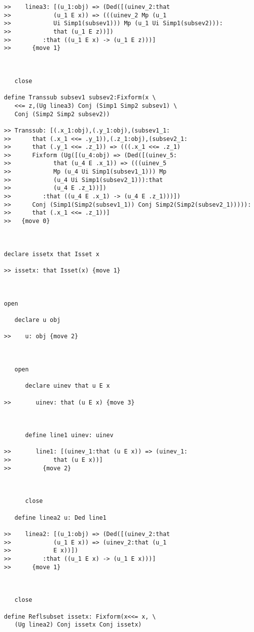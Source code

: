 \documentclass[12pt]{article}
\begin{document}
\begin{verbatim}
>>    linea3: [(u_1:obj) => (Ded([(uinev_2:that
>>            (u_1 E x)) => (((uinev_2 Mp (u_1
>>            Ui Simp1(subsev1))) Mp (u_1 Ui Simp1(subsev2))):
>>            that (u_1 E z))])
>>         :that ((u_1 E x) -> (u_1 E z)))]
>>      {move 1}



   close

define Transsub subsev1 subsev2:Fixform(x \
   <<= z,(Ug linea3) Conj (Simp1 Simp2 subsev1) \
   Conj (Simp2 Simp2 subsev2))

>> Transsub: [(.x_1:obj),(.y_1:obj),(subsev1_1:
>>      that (.x_1 <<= .y_1)),(.z_1:obj),(subsev2_1:
>>      that (.y_1 <<= .z_1)) => (((.x_1 <<= .z_1)
>>      Fixform (Ug([(u_4:obj) => (Ded([(uinev_5:
>>            that (u_4 E .x_1)) => (((uinev_5
>>            Mp (u_4 Ui Simp1(subsev1_1))) Mp
>>            (u_4 Ui Simp1(subsev2_1))):that
>>            (u_4 E .z_1))])
>>         :that ((u_4 E .x_1) -> (u_4 E .z_1)))])
>>      Conj (Simp1(Simp2(subsev1_1)) Conj Simp2(Simp2(subsev2_1))))):
>>      that (.x_1 <<= .z_1))]
>>   {move 0}



declare issetx that Isset x

>> issetx: that Isset(x) {move 1}



open

   declare u obj

>>    u: obj {move 2}



   open

      declare uinev that u E x

>>       uinev: that (u E x) {move 3}



      define line1 uinev: uinev

>>       line1: [(uinev_1:that (u E x)) => (uinev_1:
>>            that (u E x))]
>>         {move 2}



      close

   define linea2 u: Ded line1

>>    linea2: [(u_1:obj) => (Ded([(uinev_2:that
>>            (u_1 E x)) => (uinev_2:that (u_1
>>            E x))])
>>         :that ((u_1 E x) -> (u_1 E x)))]
>>      {move 1}



   close

define Reflsubset issetx: Fixform(x<<= x, \
   (Ug linea2) Conj issetx Conj issetx)


\end{verbatim}
\end{document}
